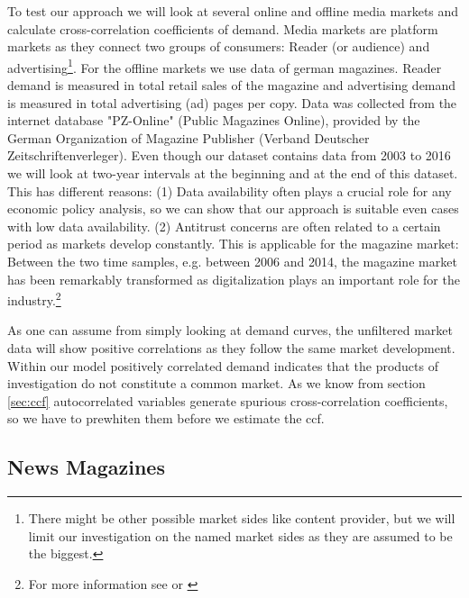 \documentclass[10pt,a4paper]{scrreprt}
\begin{document}
To test our approach we will look at several online and offline media markets and calculate cross-correlation coefficients of demand. Media markets are platform markets as they connect two groups of consumers: Reader (or audience) and advertising\footnote{There might be other possible market sides like content provider, but we will limit our investigation on the named market sides as they are assumed to be the biggest.}. For the offline markets we use data of german magazines. Reader demand is measured in total retail sales of the magazine and advertising demand is measured in total advertising (ad) pages per copy. Data was collected from the internet database "PZ-Online" (Public Magazines Online), provided by the German Organization of Magazine Publisher (Verband Deutscher Zeitschriftenverleger). Even though our dataset contains data from 2003 to 2016 we will look at two-year intervals at the beginning and at the end of this dataset. This has different reasons: (1) Data availability often plays a crucial role for any economic policy analysis, so we can show that our approach is suitable even cases with low data availability. (2) Antitrust concerns are often related to a certain period as markets develop constantly. This is applicable for the magazine market: Between the two time samples, e.g. between 2006 and 2014, the magazine market has been remarkably transformed as digitalization plays an important role for the industry.\footnote{For more information see \cite{cabyova_impact_2014} or \cite{picard_digitization_2011}}  

As one can assume from simply looking at demand curves, the unfiltered market data will show positive correlations as they follow the same market development. Within our model positively correlated demand indicates that the products of investigation do not constitute a common market. As we know from section \ref{sec:ccf} autocorrelated variables generate spurious cross-correlation coefficients, so we have to prewhiten them before we estimate the ccf.


\subsection{News Magazines} 
\end{document}
